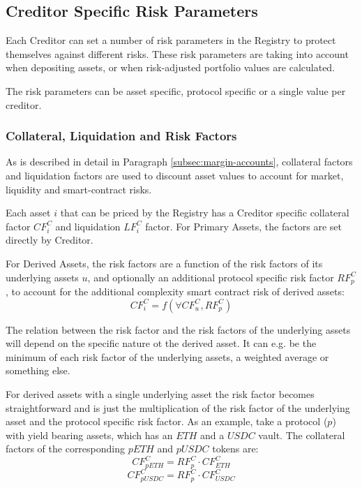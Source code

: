 \documentclass[sigconf,nonacm]{acmart}
\begin{document}
\subsection{Creditor Specific Risk Parameters}
\label{subsec:creditor-specific-cisk-parameters}
Each Creditor can set a number of risk parameters in the Registry to protect themselves against different risks.
These risk parameters are taking into account when depositing assets, or when risk-adjusted portfolio values are calculated.

The risk parameters can be asset specific, protocol specific or a single value per creditor.

\subsubsection{Collateral, Liquidation and Risk Factors}
As is described in detail in Paragraph \ref{subsec:margin-accounts}, collateral factors and liquidation factors are used to discount asset values to account for market, liquidity and smart-contract risks.

Each asset $i$ that can be priced by the Registry has a Creditor specific collateral factor $CF_{i}^{C}$ and liquidation $LF_{i}^{C}$ factor.
For Primary Assets, the factors are set directly by Creditor.

For Derived Assets, the risk factors are a function of the risk factors of its underlying assets $u$, and optionally an additional protocol specific risk factor $RF_{p}^{C}$,
to account for the additional complexity smart contract risk of derived assets:
\begin{equation}
    CF_{i}^{C} = f(\forall CF_{u}^{C}, RF_{p}^{C})
\end{equation}

The relation between the risk factor and the risk factors of the underlying assets will depend on the specific nature ot the derived asset.
It can e.g. be the minimum of each risk factor of the underlying assets, a weighted average or something else.

For derived assets with a single underlying asset the risk factor becomes straightforward and is just the multiplication of the risk factor of the underlying asset and the protocol specific risk factor.
As an example, take a protocol ($p$) with yield bearing assets, which has an $ETH$ and a $USDC$ vault.
The collateral factors of the corresponding $pETH$ and $pUSDC$ tokens are:
\begin{equation}
    CF_{pETH}^{C} = RF_{p}^{C} \cdot CF_{ETH}^{C}
\end{equation}
\begin{equation}
    CF_{pUSDC}^{C} = RF_{p}^{C} \cdot CF_{USDC}^{C}
\end{equation}
\end{document}
